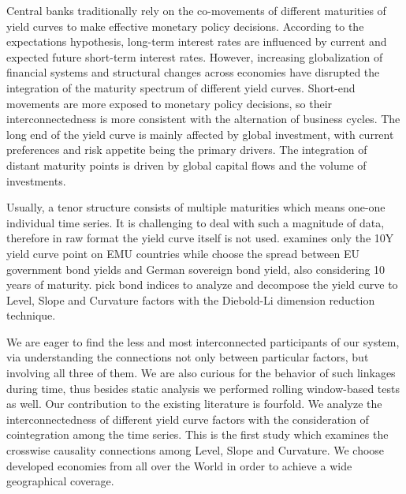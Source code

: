 \documentclass[12pt,bibliography=totoc]{article}
\begin{document}

Central banks traditionally rely on the co-movements of different maturities of yield curves to make effective monetary policy decisions. According to the expectations hypothesis, long-term interest rates are influenced by current and expected future short-term interest rates. However, increasing globalization of financial systems and structural changes across economies have disrupted the integration of the maturity spectrum of different yield curves. Short-end movements are more exposed to monetary policy decisions, so their interconnectedness is more consistent with the alternation of business cycles. The long end of the yield curve is mainly affected by global investment, with current preferences and risk appetite being the primary drivers. The integration of distant maturity points is driven by global capital flows and the volume of investments. %

Usually, a tenor structure consists of multiple maturities which means one-one individual time series. It is challenging to deal with such a magnitude of data, therefore in raw format the yield curve itself is not used. \cite{fernandez2016using} examines only the 10Y yield curve point on EMU countries while \cite{claeys2014measuring} choose the spread between EU government bond yields and German sovereign bond yield, also considering 10 years of maturity. \cite{ahmad2018financial} pick bond indices to analyze and \cite{sowmya2016linkages}
decompose the yield curve to Level, Slope and Curvature factors with the Diebold-Li dimension reduction technique. 

We are eager to find the less and most interconnected participants of our system, via understanding the connections not only between particular factors, but involving all three of them. We are also curious for the behavior of such linkages during time, thus besides static analysis we performed rolling window-based tests as well. Our contribution to the existing literature is fourfold. We analyze the interconnectedness of different yield curve factors with the consideration of cointegration among the time series. This is the first study which examines the crosswise causality connections among Level, Slope and Curvature. We choose developed economies from all over the World in order to achieve a wide geographical coverage. %
\end{document}
